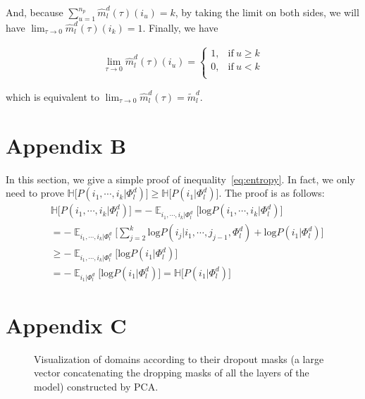 \documentclass[11pt]{article}
\begin{document}
And, because $ \displaystyle{\mathop{\sum}_{u=1}^{n_p}}\hat{m}_l^d(\tau)(i_u) = k$, by taking the limit on both sides, we will have $\lim_{\tau \rightarrow 0} \hat{m}_l^d(\tau)(i_k) = 1$. Finally, we have

\begin{align*}
\lim_{\tau \rightarrow 0} \hat{m}_l^d(\tau)(i_u) = \begin{cases}
      1, & \text{if}\ u \geqslant k \\
      0, & \text{if}\ u < k \\
    \end{cases}
\end{align*}

which is equivalent to $\lim_{\tau \rightarrow 0}\hat{m}_l^d(\tau) = \tilde{m}_l^d$.

\section{Appendix B}
\label{appendix:b}
In this section, we give a simple proof of inequality~\eqref{eq:entropy}. In fact, we only need to prove $\mathbb{H} \big[ P(i_1,\cdots,i_k | \Phi_l^d) \big] \geqslant \mathbb{H} \big[ P(i_1 | \Phi_l^d) \big]$. The proof is as follows:
\begin{align*}
&\mathbb{H} \big[ P(i_1,\cdots,i_k | \Phi_l^d) \big] = - \displaystyle{\mathop{\mathbb{E}}_{i_1,\cdots,i_k | \Phi_l^d}} \big[ \text{log}P(i_1,\cdots,i_k | \Phi_l^d) \big] \\
&= -\displaystyle{\mathop{\mathbb{E}}_{i_1,\cdots,i_k | \Phi_l^d}} \big[ \displaystyle{\sum_{j=2}^k}\text{log}P(i_j | i_1,\cdots,j_{j-1},\Phi_l^d) +  \text{log} P(i_1 | \Phi_l^d) \big] \\
&\geqslant -\displaystyle{\mathop{\mathbb{E}}_{i_1,\cdots,i_k | \Phi_l^d}} \big[ \text{log} P(i_1 | \Phi_l^d) \big] \\
&= -\displaystyle{\mathop{\mathbb{E}}_{i_1 | \Phi_l^d}} \big[ \text{log} P(i_1 | \Phi_l^d) \big] = \mathbb{H} \big[ P(i_1 | \Phi_l^d) \big]
\end{align*}
\section{Appendix C}
\begin{figure}[H]
\caption{Visualization of domains according to their dropout masks (a large vector concatenating the dropping masks of all the layers of the model) constructed by PCA.}
\label{fig:domain}
\end{figure}
\end{document}
